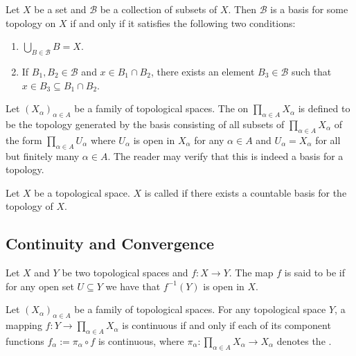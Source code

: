 \begin{definition}
	Let $X$ be a set and $\mathcal{B}$ be a collection of subsets of $X$. Then $\mathcal{B}$ is a basis for some topology on $X$ if and only if it satisfies the following two conditions:

	\begin{enumerate}
		\item $\bigcup_{B \in \mathcal{B}}B = X$.
		\item If $B_1,B_2 \in \mathcal{B}$ and $x \in B_1 \cap B_2$, there exists an element $B_3 \in \mathcal{B}$ such that $x \in B_3 \subseteq B_1\cap B_2$.
	\end{enumerate}
\end{definition}

\begin{example}
	Let $(X_\alpha)_{\alpha \in A}$ be a family of topological spaces. The  on $\prod_{\alpha \in A} X_\alpha$ is defined to be the topology generated by the basis consisting of all subsets of $\prod_{\alpha \in A} X_\alpha$ of the form $\prod_{\alpha \in A} U_\alpha$ where $U_\alpha$ is open in $X_\alpha$ for any $\alpha \in A$ and $U_\alpha = X_\alpha$ for all but finitely many $\alpha \in A$. The reader may verify that this is indeed a basis for a topology.
\end{example}

\begin{definition}
	Let $X$ be a topological space. $X$ is called  if there exists a countable basis for the topology of $X$.
\end{definition}

\subsection{Continuity and Convergence}

\begin{definition}
	Let $X$ and $Y$ be two topological spaces and $f: X \to Y$. The map $f$ is said to be  if for any open set $U \subseteq Y$ we have that $f^{-1}(Y)$ is open in $X$.
\end{definition}

\begin{proposition}
	Let $(X_\alpha)_{\alpha \in A}$ be a family of topological spaces. For any topological space $Y$, a mapping $f: Y \to \prod_{\alpha \in A}X_\alpha$ is continuous if and only if each of its component functions $f_\alpha := \pi_\alpha \circ f$ is continuous, where $\pi_\alpha: \prod_{\alpha \in A}X_\alpha \to X_\alpha$ denotes the .
	\label{prop:characteristic_property_product}
\end{proposition}

